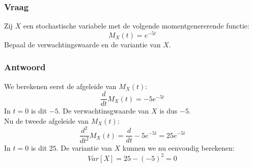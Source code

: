 \documentclass[main.tex]{subfiles}
\begin{document}
\subsubsection*{Vraag}
Zij $X$ een stochastische variabele met de volgende momentgenererende functie:
\[ M_{X}(t) = e^{-5t} \]
Bepaal de verwachtingswaarde en de variantie van $X$.

\subsubsection*{Antwoord}
We berekenen eerst de afgeleide van $M_{X}(t)$:
\[ \frac{d}{dt}M_{X}(t) = -5e^{-5t} \]
In $t=0$ is dit $-5$.
De verwachtinsgwaarde van $X$ is dus $-5$.\\
Nu de tweede afgeleide van $M_{X}(t)$:
\[ \frac{d^{2}}{dt^{2}}M_{X}(t) = \frac{d}{dt} -5e^{-5t} = 25e^{-5t} \]
In $t=0$ is dit $25$.
De variantie van $X$ kunnen we nu eenvoudig berekenen:
\[ Var[X] = 25 - (-5)^{2} = 0 \]

\iffalse
\newpage
\section{algoritme}
\subsection*{Abstract}
\subsubsection*{Vraag}
\subsubsection*{Antwoord}
\subsection*{Voorbeeld}
\subsubsection*{Vraag}
\subsubsection*{Antwoord}
\fi
\end{document}
